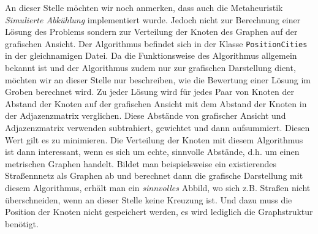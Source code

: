 An dieser Stelle möchten wir noch anmerken, dass auch die Metaheuristik \emph{Simulierte Abkühlung} implementiert wurde. Jedoch nicht zur Berechnung einer Lösung des Problems sondern zur Verteilung der Knoten des Graphen auf der grafischen Ansicht. Der Algorithmus befindet sich in der Klasse \texttt{PositionCities} in der gleichnamigen Datei. Da die Funktionsweise des Algorithmus allgemein bekannt ist und der Algorithmus zudem nur zur grafischen Darstellung dient, möchten wir an dieser Stelle nur beschreiben, wie die Bewertung einer Lösung im Groben berechnet wird. Zu jeder Lösung wird für jedes Paar von Knoten der Abstand der Knoten auf der grafischen Ansicht mit dem Abstand der Knoten in der Adjazenzmatrix verglichen. Diese Abstände von grafischer Ansicht und Adjazenzmatrix verwenden subtrahiert, gewichtet und dann aufsummiert. Diesen Wert gilt es zu minimieren. Die Verteilung der Knoten mit diesem Algorithmus ist dann interessant, wenn es sich um echte, sinnvolle Abstände, d.h. um einen metrischen Graphen handelt. Bildet man beispielsweise ein existierendes Straßennnetz als Graphen ab und berechnet dann die grafische Darstellung mit diesem Algorithmus, erhält man ein \emph{sinnvolles} Abbild, wo sich z.B. Straßen nicht überschneiden, wenn an dieser Stelle keine Kreuzung ist. Und dazu muss die Position der Knoten nicht gespeichert werden, es wird lediglich die Graphstruktur benötigt.


